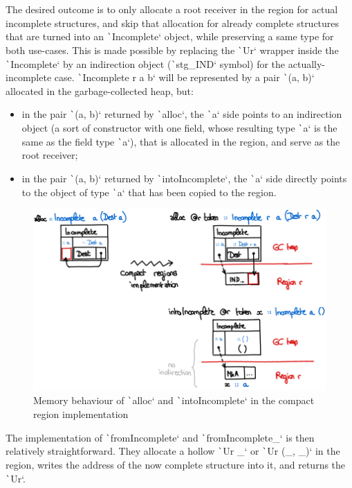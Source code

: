 \documentclass[english]{jflart}
\begin{document}
The desired outcome is to only allocate a root receiver in the region for actual incomplete structures, and skip that allocation for already complete structures that are turned into an \texttt`Incomplete` object, while preserving a same type for both use-cases. This is made possible by replacing the \texttt`Ur` wrapper inside the \texttt`Incomplete` by an 
indirection object (\texttt`stg_IND` symbol) for the actually-incomplete case. \texttt`Incomplete r a b` will be represented by a pair \texttt`(a, b)` allocated in the garbage-collected heap, but:
\begin{itemize}
  \item in the pair \texttt`(a, b)` returned by \texttt`alloc`, the \texttt`a` side points to an indirection object (a sort of constructor with one field, whose resulting type \texttt`a` is the same as the field type \texttt`a`), that is allocated in the region, and serve as the root receiver;
  \item in the pair \texttt`(a, b)` returned by \texttt`intoIncomplete`, the \texttt`a` side directly points to the object of type \texttt`a` that has been copied to the region.
\end{itemize}

\begin{figure}[t]\centering
  \includegraphics[width=12cm]{alloc-region.png}
  \caption{Memory behaviour of \texttt`alloc` and \texttt`intoIncomplete` in the compact region implementation}
  \label{fig:schema-alloc-region}
\end{figure}

The implementation of \texttt`fromIncomplete` and \texttt`fromIncomplete_` is then relatively straightforward. They allocate a hollow \texttt`Ur _` or \texttt`Ur (_, _)` in the region, writes the address of the now complete structure into it, and returns the \texttt`Ur`.
\end{document}
